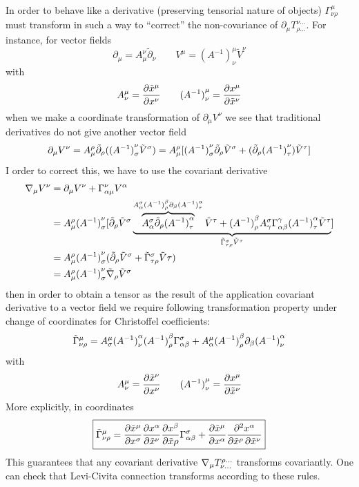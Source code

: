 \documentclass[../main/main.tex]{subfiles}
\begin{document}
In order to behave like a derivative (preserving tensorial nature of objects)  $\Gamma^\mu_{\nu\rho}$ must transform in such a way to ``correct'' the non-covariance of $\partial_\mu T^{\nu\dots}_{\rho\dots}$. For instance, for vector fields
\[\partial_\mu=A^\nu_\mu\tilde\partial_\nu\qquad V^\mu={(A^{-1})}^\mu_\nu\tilde V^\nu\]
with
\[{A}^{\mu}_{\nu}=\frac{\partial \tilde x^\mu}{\partial x^\nu}\qquad{(A^{-1})}^{\mu}_{\nu}=\frac{\partial x^\mu}{\partial \tilde x^\nu}\]
when we make a coordinate transformation of $\partial_\mu V^\nu$ we see that traditional derivatives do not give another vector field
\[\partial_\mu V^\nu={A}^{\rho}_{\mu}\tilde\partial_\rho({(A^{-1})}^{\nu}_{\sigma}\tilde V^\sigma)={A}^{\rho}_{\mu}[{(A^{-1})}^{\nu}_{\sigma}\tilde\partial_\rho\tilde V^\sigma+(\tilde \partial_\rho{(A^{-1})}^{\nu}_{\tau})\tilde V^\tau]\]
I order to correct this, we have to use the covariant derivative
\begin{align*}
\nabla_\mu V^\nu
&=\partial_\mu V^\nu+{\Gamma}^{\nu}_{\alpha\mu}V^\alpha\\
&={A}^{\rho}_{\mu}{(A^{-1})}^{\nu}_{\sigma}[\tilde\partial_\rho\tilde V^\sigma\underbrace{\overbrace{{A}^{\sigma}_{\alpha}\tilde\partial_\rho{(A^{-1})}^{\alpha}_{\tau}}^{{A}^{\sigma}_{\alpha}{(A^{-1})}^{\beta}_{\rho}\partial_\beta{(A^{-1})}^{\alpha}_{\tau}}\tilde V^\tau+{(A^{-1})}^{\beta}_{\rho}{A}^{\sigma}_{\gamma}{\Gamma}^{\gamma}_{\alpha\beta}{(A^{-1})}^{\alpha}_{\tau}\tilde V^\tau}_{{\tilde\Gamma}^{\sigma}_{\tau\rho}\tilde V^\tau}]\\
&={A}^{\rho}_{\mu}{(A^{-1})}^{\nu}_{\sigma}(\tilde\partial_\rho\tilde V^\sigma+{\tilde\Gamma}^{\sigma}_{\tau\rho}\tilde V\tau)\\
&={A}^{\rho}_{\mu}{(A^{-1})}^{\nu}_{\sigma}\tilde\nabla_\rho\tilde V^\sigma
\end{align*}
then in order to obtain a tensor as the result of the application covariant derivative to a vector field we require following transformation property under change of coordinates for Christoffel coefficients:
\begin{equation}
{\tilde\Gamma}^{\mu}_{\nu\rho}={A}^{\mu}_{\sigma}{(A^{-1})}^{\alpha}_{\nu}{(A^{-1})}^{\beta}_{\rho}{\Gamma}^{\sigma}_{\alpha\beta}+{A}^{\mu}_{\alpha}{(A^{-1})}^{\beta}_{\rho}\partial_\beta{(A^{-1})}^{\alpha}_{\nu}
\end{equation}
with
\[{A}^{\mu}_{\nu}=\frac{\partial \tilde x^\nu}{\partial x^\nu}\qquad{(A^{-1})}^{\mu}_{\nu}=\frac{\partial x^\mu}{\partial \tilde x^\nu}\]
More explicitly, in coordinates
\begin{equation}\label{eqn:transf-rule-LC-coeff}\boxed{
{\tilde\Gamma}^{\mu}_{\nu \rho}=\frac{\partial \tilde x^\mu}{\partial x^\sigma}\frac{\partial x^\alpha}{\partial \tilde x^\nu}\frac{\partial x^\beta}{\partial \tilde x\rho}{\Gamma}^{\sigma}_{\alpha \beta}+\frac{\partial \tilde x^\mu}{\partial x^\alpha}\frac{\partial^2 x^\alpha}{\partial \tilde x^\rho\,\partial \tilde x^\nu}
}\end{equation}
This guarantees that any covariant derivative $\nabla_\mu{T}^{\rho\dots}_{\nu\dots}$ transforms covariantly. One can check that Levi-Civita connection transforms according to these rules. 
\end{document}
